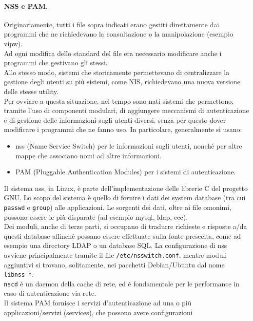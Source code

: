 \documentclass[a4paper]{report}
\begin{document}
\paragraph{NSS e PAM.} Originariamente, tutti i file sopra indicati erano gestiti
direttamente dai programmi che ne richiedevano la
consultazione o la manipolazione (esempio vipw).\\
Ad ogni modifica dello standard del file era necessario
modificare anche i programmi che gestivano gli stessi.\\
Allo stesso modo, sistemi che storicamente
permettevano di centralizzare la gestione degli utenti
su più sistemi, come NIS, richiedevano una nuova
versione delle stesse utility.\\
Per ovviare a questa situazione, nel tempo sono nati
sistemi che permettono, tramite l'uso di componenti
modulari, di aggiungere meccanismi di autenticazione e
di gestione delle informazioni sugli utenti diversi, senza
per questo dover modificare i programmi che ne fanno
uso. In particolare, generalmente si usano:\\
\begin{itemize}
\item nss (Name Service Switch) per le informazioni sugli utenti,
nonché per altre mappe che associano nomi ad altre
informazioni.
\item PAM (Pluggable Authentication Modules) per i sistemi di
autenticazione.
\end{itemize}
Il sistema nss, in Linux, è parte dell'implementazione delle librerie C
del progetto GNU. Lo scopo del sistema è quello di fornire i dati dei
system database (tra cui \texttt{passwd} e \texttt{group}) alle applicazioni. Le
sorgenti dei dati, oltre ai file omonimi, possono essere le più disparate
(ad esempio mysql, ldap, ecc).\\
Dei moduli, anche di terze parti, si occupano di tradurre richieste e
risposte a/da questi database affinché possano essere effettuate sulla
fonte prescelta, come ad esempio una directory LDAP o un database
SQL. La configurazione di nss avviene principalmente tramite il file
\texttt{/etc/nsswitch.conf}, mentre moduli aggiuntivi si trovano,
solitamente, nei pacchetti Debian/Ubuntu dal nome \texttt{libnss-*}.\\
\texttt{nscd} è un daemon della cache di rete, ed è fondamentale per le performance in caso di autenticazione via rete.\\
Il sistema PAM fornisce i servizi d'autenticazione ad una o più
applicazioni/servizi (services), che possono avere configurazioni
\end{document}
